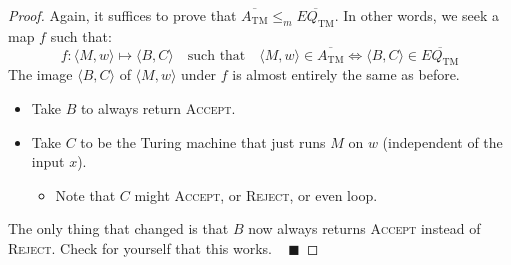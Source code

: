 \begin{proof}
    Again, it suffices to prove that
    $\overline{A_{\mathrm{TM}}} \leq_m \overline{EQ_{\mathrm{TM}}}$.
    In other words, we seek a map $f$ such that:
    \[
    f \colon \langle M, w \rangle \mapsto \langle B, C \rangle
    ~~~ \text{ such that } ~~~
    \boxed{\langle M, w \rangle \in \overline{A_{\mathrm{TM}}}
    \iff \langle B, C \rangle \in \overline{EQ_{\mathrm{TM}}}}
    \]
    The image $\langle B, C \rangle$ of $\langle M, w \rangle$ under $f$
    is almost entirely the same as before.
    \begin{itemize}
        \item Take $B$ to always return \textsc{Accept}.
        \item Take $C$ to be the Turing machine that
        just runs $M$ on $w$ (independent of the input $x$).
        \begin{itemize}
            \item Note that $C$ might \textsc{Accept},
            or \textsc{Reject}, or even loop.
        \end{itemize}
    \end{itemize}
    The only thing that changed is that
    $B$ now always returns \textsc{Accept} instead of \textsc{Reject}.
    Check for yourself that this works. ~ $\blacksquare$
\end{proof}

